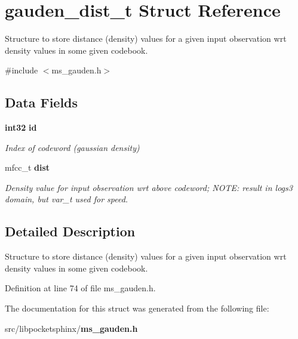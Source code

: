 \section{gauden\-\_\-dist\-\_\-t \-Struct \-Reference}
\label{structgauden__dist__t}


\-Structure to store distance (density) values for a given input observation wrt density values in some given codebook.  




{\ttfamily \#include $<$ms\-\_\-gauden.\-h$>$}

\subsection*{\-Data \-Fields}
\begin{DoxyCompactItemize}
\item 
{\bf int32} {\bf id}\label{structgauden__dist__t_a93e978149bae5b5bf089769458c42ee4}

\begin{DoxyCompactList}\small\item\em \-Index of codeword (gaussian density) \end{DoxyCompactList}\item 
mfcc\-\_\-t {\bf dist}\label{structgauden__dist__t_ab08100d4953998dad76bfcf30864c0c5}

\begin{DoxyCompactList}\small\item\em \-Density value for input observation wrt above codeword; \-N\-O\-T\-E\-: result in logs3 domain, but var\-\_\-t used for speed. \end{DoxyCompactList}\end{DoxyCompactItemize}


\subsection{\-Detailed \-Description}
\-Structure to store distance (density) values for a given input observation wrt density values in some given codebook. 

\-Definition at line 74 of file ms\-\_\-gauden.\-h.



\-The documentation for this struct was generated from the following file\-:\begin{DoxyCompactItemize}
\item 
src/libpocketsphinx/{\bf ms\-\_\-gauden.\-h}\end{DoxyCompactItemize}
